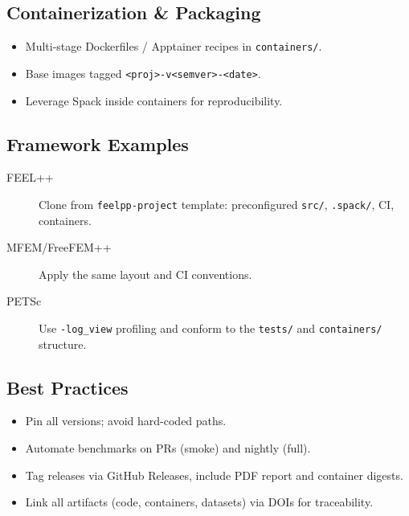 \subsection{Containerization \& Packaging}
\begin{itemize}
  \item Multi-stage Dockerfiles / Apptainer recipes in \texttt{containers/}.  
  \item Base images tagged \texttt{<proj>-v<semver>-<date>}.  
  \item Leverage Spack inside containers for reproducibility.
\end{itemize}

\subsection{Framework Examples}
\begin{description}
  \item[FEEL++] Clone from \texttt{feelpp-project} template: preconfigured \texttt{src/}, \texttt{.spack/}, CI, containers.  
  \item[MFEM/FreeFEM++] Apply the same layout and CI conventions.  
  \item[PETSc] Use \texttt{-log\_view} profiling and conform to the \texttt{tests/} and \texttt{containers/} structure.
\end{description}

\subsection{Best Practices}
\begin{itemize}
  \item Pin all versions; avoid hard-coded paths.  
  \item Automate benchmarks on PRs (smoke) and nightly (full).  
  \item Tag releases via GitHub Releases, include PDF report and container digests.  
  \item Link all artifacts (code, containers, datasets) via DOIs for traceability.
\end{itemize}
